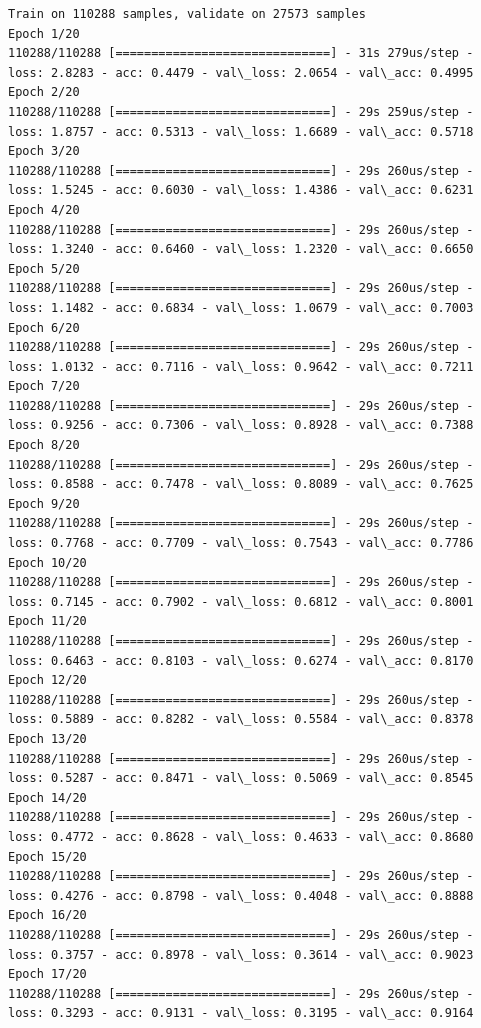\documentclass[11pt]{article}
\begin{document}
    \begin{Verbatim}[commandchars=\\\{\}]
Train on 110288 samples, validate on 27573 samples
Epoch 1/20
110288/110288 [==============================] - 31s 279us/step - loss: 2.8283 - acc: 0.4479 - val\_loss: 2.0654 - val\_acc: 0.4995
Epoch 2/20
110288/110288 [==============================] - 29s 259us/step - loss: 1.8757 - acc: 0.5313 - val\_loss: 1.6689 - val\_acc: 0.5718
Epoch 3/20
110288/110288 [==============================] - 29s 260us/step - loss: 1.5245 - acc: 0.6030 - val\_loss: 1.4386 - val\_acc: 0.6231
Epoch 4/20
110288/110288 [==============================] - 29s 260us/step - loss: 1.3240 - acc: 0.6460 - val\_loss: 1.2320 - val\_acc: 0.6650
Epoch 5/20
110288/110288 [==============================] - 29s 260us/step - loss: 1.1482 - acc: 0.6834 - val\_loss: 1.0679 - val\_acc: 0.7003
Epoch 6/20
110288/110288 [==============================] - 29s 260us/step - loss: 1.0132 - acc: 0.7116 - val\_loss: 0.9642 - val\_acc: 0.7211
Epoch 7/20
110288/110288 [==============================] - 29s 260us/step - loss: 0.9256 - acc: 0.7306 - val\_loss: 0.8928 - val\_acc: 0.7388
Epoch 8/20
110288/110288 [==============================] - 29s 260us/step - loss: 0.8588 - acc: 0.7478 - val\_loss: 0.8089 - val\_acc: 0.7625
Epoch 9/20
110288/110288 [==============================] - 29s 260us/step - loss: 0.7768 - acc: 0.7709 - val\_loss: 0.7543 - val\_acc: 0.7786
Epoch 10/20
110288/110288 [==============================] - 29s 260us/step - loss: 0.7145 - acc: 0.7902 - val\_loss: 0.6812 - val\_acc: 0.8001
Epoch 11/20
110288/110288 [==============================] - 29s 260us/step - loss: 0.6463 - acc: 0.8103 - val\_loss: 0.6274 - val\_acc: 0.8170
Epoch 12/20
110288/110288 [==============================] - 29s 260us/step - loss: 0.5889 - acc: 0.8282 - val\_loss: 0.5584 - val\_acc: 0.8378
Epoch 13/20
110288/110288 [==============================] - 29s 260us/step - loss: 0.5287 - acc: 0.8471 - val\_loss: 0.5069 - val\_acc: 0.8545
Epoch 14/20
110288/110288 [==============================] - 29s 260us/step - loss: 0.4772 - acc: 0.8628 - val\_loss: 0.4633 - val\_acc: 0.8680
Epoch 15/20
110288/110288 [==============================] - 29s 260us/step - loss: 0.4276 - acc: 0.8798 - val\_loss: 0.4048 - val\_acc: 0.8888
Epoch 16/20
110288/110288 [==============================] - 29s 260us/step - loss: 0.3757 - acc: 0.8978 - val\_loss: 0.3614 - val\_acc: 0.9023
Epoch 17/20
110288/110288 [==============================] - 29s 260us/step - loss: 0.3293 - acc: 0.9131 - val\_loss: 0.3195 - val\_acc: 0.9164

\end{Verbatim}
\end{document}

